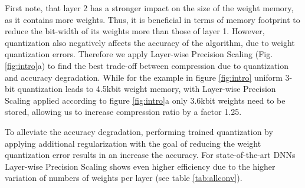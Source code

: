 First note, that layer 2 has a stronger impact on the size of the weight memory, as it contains more weights. Thus, it is beneficial in terms of memory footprint to reduce the bit-width of its weights more than those of layer 1. 
However, quantization also negatively affects the accuracy of the algorithm, due to weight quantization errors. Therefore we apply Layer-wise Precision Scaling (Fig. \ref{fig:intro}a) to find the best trade-off between compression due to quantization and accuracy degradation.
While for the example in figure \ref{fig:intro} uniform 3-bit quantization leads to 4.5kbit weight memory, with Layer-wise Precision Scaling applied according to figure \ref{fig:intro}a only 3.6kbit weights need to be stored, allowing us to increase compression ratio by a factor 1.25.

To alleviate the accuracy degradation, performing trained quantization by applying additional regularization with the goal of reducing the weight quantization error results in an increase the accuracy. For state-of-the-art DNNs Layer-wise Precision Scaling shows even higher efficiency due to the higher variation of numbers of weights per layer (see table \ref{tab:allconv}).



